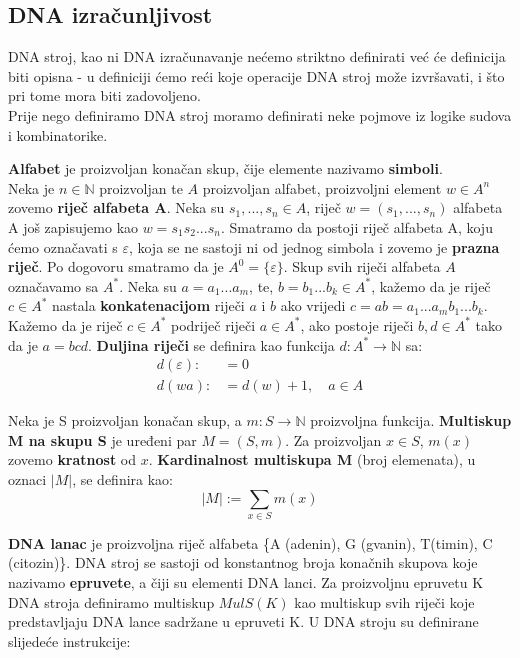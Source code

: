 \documentclass[a4paper,oneside,12pt]{memoir} %
\begin{document}
\begin{spacing}{1.5}
\section{DNA izračunljivost}
\label{sec:DNAizr}
DNA stroj, kao ni DNA izračunavanje nećemo striktno definirati već će definicija biti opisna - u definiciji ćemo reći koje operacije DNA stroj može izvršavati, i što pri tome mora biti zadovoljeno.\\ Prije nego definiramo DNA stroj moramo definirati neke pojmove iz logike sudova i kombinatorike.
\begin{defn}
\textbf{Alfabet} je proizvoljan konačan skup, čije elemente nazivamo \textbf{simboli}.\\
Neka je $n \in \mathbb{N}$ proizvoljan te $A$ proizvoljan alfabet, proizvoljni element $w \in A^n$ zovemo \textbf{riječ alfabeta A}. Neka su $s_1,..., s_n \in A$, riječ $w=(s_1,...,s_n)$ alfabeta A još zapisujemo kao $w=s_1s_2...s_n$. Smatramo da postoji riječ alfabeta A, koju ćemo označavati s $\varepsilon$, koja se ne sastoji ni od jednog simbola i zovemo je \textbf{prazna riječ}. Po dogovoru smatramo da je $A^0=\{\varepsilon\}$. Skup svih riječi alfabeta $A$ označavamo sa $A^*$. Neka su $a=a_1...a_m$, te, $b=b_1...b_k \in A^*$, kažemo da je riječ $c \in A^*$ nastala \textbf{konkatenacijom} riječi $a$ i $b$ ako vrijedi $c=ab=a_1...a_mb_1...b_k$. Kažemo da je riječ $c \in A^*$ podriječ riječi $a \in A^*$, ako postoje riječi $b, d \in A^*$ tako da je $a=bcd$. \textbf{Duljina riječi} se definira kao funkcija $d:A^*\to \mathbb{N}$ sa:
\begin{align*}
	d(\varepsilon) :&= 0 \\
	d(wa) :&= d(w)+1, \quad a \in A
\end{align*}
\end{defn}
\begin{defn}
Neka je S proizvoljan konačan skup, a $m:S \to \mathbb{N}$ proizvoljna funkcija. \textbf{Multiskup M na skupu S} je uređeni par $M=(S,m)$. Za proizvoljan $x\in S$, $m(x)$ zovemo \textbf{kratnost} od $x$. \textbf{Kardinalnost multiskupa M} (broj elemenata), u oznaci $|M|$, se definira kao:
\[|M|:=\sum_{x \in S} m(x)\]
\end{defn}
\begin{defn}
 \textbf{DNA lanac} je proizvoljna riječ alfabeta \{A (adenin), G (gvanin), T(timin), C (citozin)\}. DNA stroj se sastoji od konstantnog broja konačnih skupova koje nazivamo \textbf{epruvete}, a čiji su elementi DNA lanci. Za proizvoljnu epruvetu K DNA stroja definiramo multiskup $MulS(K)$ kao multiskup svih riječi koje predstavljaju DNA lance sadržane u epruveti K. U DNA stroju su definirane slijedeće instrukcije:

\end{defn}
\end{spacing}
\end{document}
